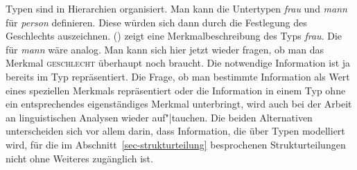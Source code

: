 Typen sind in Hierarchien organisiert.
Man kann \zb die Untertypen \textit{frau} und \textit{mann} für \textit{person}
definieren. Diese würden sich dann durch die Festlegung des Geschlechts auszeichnen.
() zeigt eine Merkmalbeschreibung des Typs \textit{frau}. Die für \textit{mann}
wäre analog.
\ea
{}
\z
Man kann sich hier jetzt wieder fragen, ob man das Merkmal \textsc{geschlecht} überhaupt
noch braucht. Die notwendige Information ist ja bereits im Typ  repräsentiert.
Die Frage, ob man bestimmte Information als Wert eines speziellen Merkmals repräsentiert oder die
Information in einem Typ ohne ein entsprechendes eigenständiges Merkmal unterbringt,  
wird auch bei der Arbeit an linguistischen Analysen wieder auf"|tauchen.
Die beiden Alternativen unterscheiden sich vor allem darin, dass Information, die
über Typen modelliert wird, für die im Abschnitt~\ref{sec-strukturteilung} besprochenen Strukturteilungen
nicht ohne Weiteres %
zugänglich ist.
\largerpage

